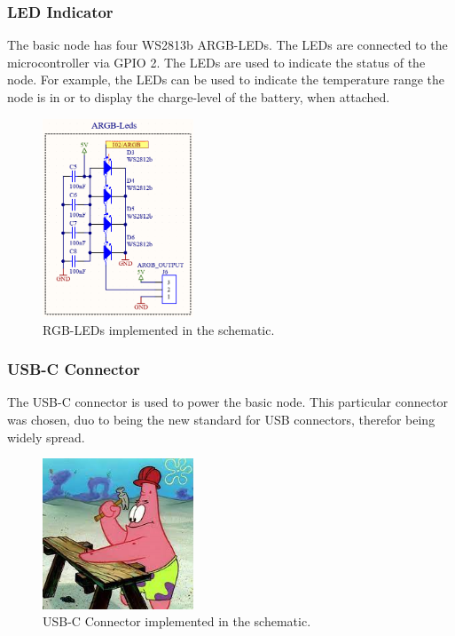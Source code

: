     \subsubsection{LED Indicator}
        The basic node has four WS2813b ARGB-LEDs. The LEDs are connected to the 
        microcontroller via GPIO 2. The LEDs are used to indicate the status of the node. 
        For example, the LEDs can be used to indicate the temperature range the node is in
        or to display the charge-level of the battery, when attached.

        \begin{figure}[H]
            \centering
            \includegraphics[width=0.4\textwidth]{assets/HW/RGB-LED-schematic.png}
            \caption{RGB-LEDs implemented in the schematic.}
        \end{figure}

    \subsubsection{USB-C Connector}

    The USB-C connector is used to power the basic node. This particular connector was
    chosen, duo to being the new standard for USB connectors, therefor being widely spread.
    
    \begin{figure}[H]
        \centering
        \includegraphics[width=0.4\textwidth]{assets/HW/TBD2.png}
        \caption{USB-C Connector implemented in the schematic.}
    \end{figure}

